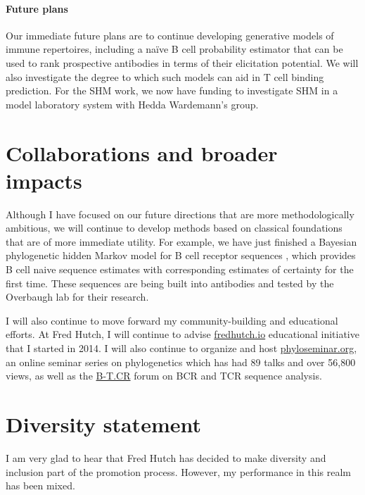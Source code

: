 \documentclass[nobib]{tufte-handout}
\begin{document}
\paragraph{Future plans}
Our immediate future plans are to continue developing generative models of immune repertoires, including a na\"ive B cell probability estimator that can be used to rank prospective antibodies in terms of their elicitation potential.
We will also investigate the degree to which such models can aid in T cell binding prediction.
For the SHM work, we now have funding to investigate SHM in a model laboratory system with Hedda Wardemann's group.


\section{Collaborations and broader impacts}

Although I have focused on our future directions that are more methodologically ambitious, we will continue to develop methods based on classical foundations that are of more immediate utility.
For example, we have just finished a Bayesian phylogenetic hidden Markov model for B cell receptor sequences \cite{Dhar2019-qg}, which provides B cell naive sequence estimates with corresponding estimates of certainty for the first time.
These sequences are being built into antibodies and tested by the Overbaugh lab for their research.

I will also continue to move forward my community-building and educational efforts.
At Fred Hutch, I will continue to advise \href{http://fredhutch.io/}{fredhutch.io} educational initiative that I started in 2014.
I will also continue to organize and host \href{http://phyloseminar.org/}{phyloseminar.org}, an online seminar series on phylogenetics which has had 89 talks and over 56,800 views, as well as the \href{http://b-t.cr/}{B-T.CR} forum on BCR and TCR sequence analysis.



\newpage




\newpage

\section{Diversity statement}

I am very glad to hear that Fred Hutch has decided to make diversity and inclusion part of the promotion process.
However, my performance in this realm has been mixed.
\end{document}
